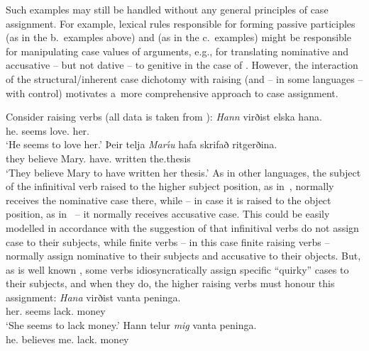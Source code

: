 \documentclass[output=paper
 	        ,biblatex
                ,babelshorthands
                ,newtxmath
                ,draftmode
                ,colorlinks, citecolor=brown
]{langscibook}
\begin{document}
Such examples may still be handled without any general principles of case assignment.  For example, lexical rules \citep[209–218]{ps} responsible for forming passive participles (as in the b.~examples above) and  (as in the c.~examples) might be responsible for manipulating case values of arguments, e.g., for translating nominative and accusative – but not dative – to genitive in the case of .  However, the interaction of the structural/inherent case dichotomy with raising (and – in some languages – with control) motivates a~more comprehensive approach to case assignment.

Consider  raising verbs (all  data is taken from \citealt[304–305]{SKG92}):
\eal
\label{isl:nom}
\ex
\gll \emph{Hann} virðist elska hana. \\
     he.\NOM{} seems love.\INF{} her.\ACC{}\\\hfill{}
\glt `He seems to love her.'
\ex
\gll Þeir telja \emph{Mar{\'\i}u} hafa skrifað ritgerðina. \\
     they believe Mary.\ACC{} have.\INF{} written the.thesis\\
\glt `They believe Mary to have written her thesis.'
\zl
As in other languages, the subject of the infinitival verb raised to the higher subject position, as in~, normally receives the nominative case there, while – in case it is raised to the object position, as in~ – it normally receives accusative case.  This could be easily modelled in accordance with the suggestion of \citet[30]{ps2} that infinitival verbs do not assign case to their subjects, while finite verbs – in this case finite raising verbs – normally assign nominative to their subjects and accusative to their objects.  But, as is well known \citep{Andrews82a-u-kopiert,zae:mal:83,ZMT85a}, some  verbs idiosyncratically assign specific “quirky” cases to their subjects, and when they do, the higher raising verbs must honour this assignment:
\eal\label{isl:acc}
\ex
\gll \emph{Hana} virðist vanta peninga. \\
      her.\ACC{} seems lack.\INF{} money\\\hfill{}
\glt `She seems to lack money.'
\ex
\gll Hann telur \emph{mig} vanta peninga. \\
      he.\NOM{} believes me.\ACC{} lack.\INF{} money\\
\end{document}
